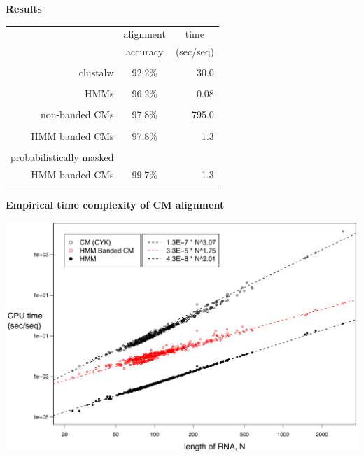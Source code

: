 \documentclass[landscape]{slides}
\begin{document}
\begin{slide}
\begin{center}
\large
\textbf{Results}
\end{center}
\medskip
\medskip
\begin{center}

\begin{tabular}{rcr} 
& \multicolumn{1}{c}{alignment} & \multicolumn{1}{c}{time} \\
& \multicolumn{1}{c}{accuracy} & \multicolumn{1}{c}{(sec/seq)} \\ \hline
& \multicolumn{1}{c}{} & \multicolumn{1}{c}{} \\
clustalw & 92.2\% & 30.0 \\ 
& \multicolumn{1}{c}{} & \multicolumn{1}{c}{} \\
HMMs & 96.2\% & 0.08 \\ 
& \multicolumn{1}{c}{} & \multicolumn{1}{c}{} \\
non-banded CMs & 97.8\% & 795.0 \\ 
& \multicolumn{1}{c}{} & \multicolumn{1}{c}{} \\
HMM banded CMs & 97.8\% & 1.3 \\ %
& \multicolumn{1}{c}{} & \multicolumn{1}{c}{} \\
probabilistically masked & & \\
HMM banded CMs           & 99.7\% & 1.3 \\ %
& \multicolumn{1}{c}{} & \multicolumn{1}{c}{} \\
\end{tabular}
\end{center}

\vfill
\end{slide}
%
\begin{slide}
\begin{center}
\textbf{Empirical time complexity of CM alignment}

\includegraphics[width=10in]{figs/aln-complexity}

\vfill
\end{center}
\end{slide}
\end{document}
